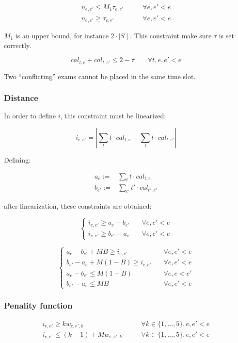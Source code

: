 \documentclass[11pt, a4paper, leqno]{article}
\begin{document}
	\begin{align*}
		n_{e,e'} \leq M_1\tau_{e,e'} &\qquad \forall e,e'<e \\
		n_{e,e'} \geq \tau_{e,e'} &\qquad \forall e,e'<e
	\end{align*}
	
	$M_1$ is an upper bound, for instance $2\cdot\mid S\mid$. This constraint make sure $\tau$ is set correctly.

	\[
		cal_{t,e}+cal_{t,e'} \leq 2 - \tau \qquad \forall t,e,e'<e
	\]
	
	Two ``conflicting'' exams cannot be placed in the same time slot.
	
	\subsubsection{Distance}
	
	In order to define $i$, this constraint must be linearized:
	
	\[
	i_{e,e'} = \left|\sum_{t} t\cdot cal_{t,e} - \sum_{t} t\cdot cal_{t,e'}\right|
	\]
	
	Defining:
	
	\begin{align*}
		a_e :=& \sum_{t} t\cdot cal_{t,e} \\
		b_{e'} :=& \sum_{t'} t'\cdot cal_{t',e'}
	\end{align*}
	
	after linearization, these constraints are obtained:
	
	\[
	\begin{cases}
		i_{e,e'} \geq a_e-b_{e'}&\quad \forall e,e'<e\\
		i_{e,e'} \geq b_{e'}-a_e&\quad \forall e,e'<e
	\end{cases}
	\]
	
	\[
	\begin{cases}
	a_e-b_{e'} + MB \geq i_{e,e'}&\quad \forall e,e'<e\\
	b_{e'}-a_e + M(1-B) \geq i_{e,e'}&\quad \forall e,e'<e\\
	a_e-b_{e'} \leq M(1-B)&\quad \forall e,e<e'\\
	b_{e'}-a_e \leq MB&\quad \forall e,e'<e
	\end{cases}
	\]
	
	\subsubsection{Penality function}
	
	\begin{align*}
		i_{e,e'} \geq k w_{e,e',k} &\qquad\forall k \in \{1,\dots,5\},e,e'<e\\
		i_{e,e'} \leq (k-1) + M  w_{e,e',k} &\qquad\forall k \in \{1,\dots,5\},e,e'<e
	\end{align*}
	
\end{document}
